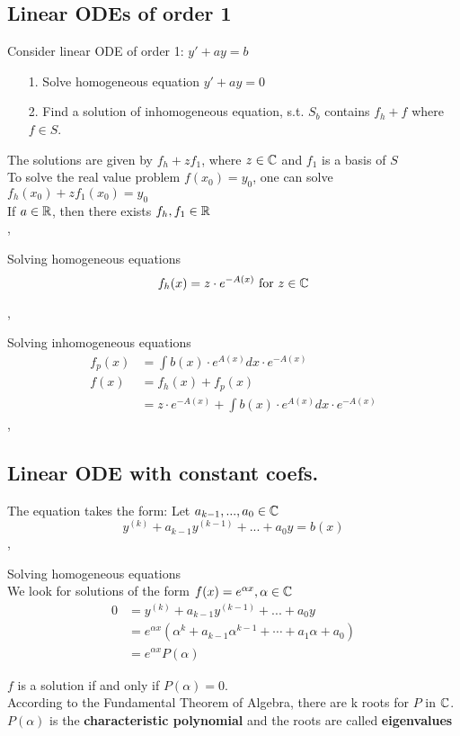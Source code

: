 \subsection{Linear ODEs of order 1}
\Def Consider linear ODE of order 1: $y' + ay = b $
\begin{enumerate}
\item[1.] Solve homogeneous equation $y' + ay = 0$ 
\item[2.] Find a solution of inhomogeneous equation, s.t. $S_b$ contains $f_h + f$ where $f \in S$.
\end{enumerate}
\Bem The solutions are given by $f_h + z f_1$, where $z \in \mathbb{C}$ and $f_1$ is a basis of $S$ \\
\Bem To solve the real value problem $f(x_0) = y_0$, one can solve $f_h(x_0) + z f_1(x_0) = y_0$ \\
\Bem If $a \in \mathbb{R}$, then there exists $f_h, f_1 \in \mathbb{R}$ \\

\sep

\Procedure Solving homogeneous equations
\[ f_h(x) = z \cdot e^{-A(x)} \text{ for } z \in \mathbb{C}\]

\sep

\Procedure Solving inhomogeneous equations
\begin{align*}
f_p(x) &= \int b(x) \cdot e^{A(x)} dx \cdot e^{-A(x)} \\
f(x) &= f_h(x) + f_p(x) \\
&= z \cdot e^{-A(x)} + \int b(x) \cdot e^{A(x)} dx \cdot e^{-A(x)}
\end{align*}
\sep

\subsection{Linear ODE with constant coefs. }
The equation takes the form: Let $a_{k - 1}, ..., a_0 \in \mathbb{C}$
\[ y^{(k)} + a_{k - 1} y^{(k - 1)} + ... + a_0 y = b(x) \] 
\sep

\Procedure Solving homogeneous equations \\
We look for solutions of the form $f(x) = e^{\alpha x}, \alpha \in \mathbb{C}$
\begin{align*}
0 &=y^{(k)} + a_{k - 1} y^{(k - 1)} + ... + a_0 y \\
&=  e^{\alpha x}( \alpha^k + a_{k - 1} \alpha^{k - 1} + \cdots + a_1 \alpha + a_0) \\
&= e^{\alpha x} P(\alpha)
\end{align*}

\Theorem $f$ is a solution if and only if $P(\alpha) = 0$. \\
\Bem According to the Fundamental Theorem of Algebra, there are k roots for $P$ in $\mathbb{C}$. \\
\Bem $P(\alpha)$ is the \textbf{characteristic polynomial} and the roots are called \textbf{eigenvalues}\\

